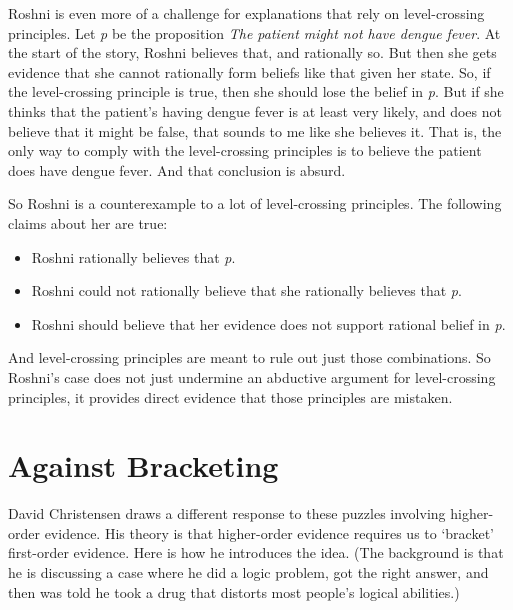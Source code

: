 \gls{Roshni} is even more of a challenge for explanations that rely on level-crossing principles. Let \emph{p} be the proposition \emph{The patient might not have dengue fever}. At the start of the story, \gls{Roshni} believes that, and rationally so. But then she gets evidence that she cannot rationally form beliefs like that given her state. So, if the level-crossing principle is true, then she should lose the belief in \emph{p}. But if she thinks that the patient's having dengue fever is at least very likely, and does not believe that it might be false, that sounds to me like she believes it. That is, the only way to comply with the level-crossing principles is to believe the patient does have dengue fever. And that conclusion is absurd.

So \gls{Roshni} is a counterexample to a lot of level-crossing principles. The following claims about her are true:

\begin{itemize}
\item{} \gls{Roshni} rationally believes that \emph{p}.

\item{} \gls{Roshni} could not rationally believe that she rationally believes that \emph{p}.

\item{} \gls{Roshni} should believe that her evidence does not support rational belief in \emph{p}.

\end{itemize}
And level-crossing principles are meant to rule out just those combinations. So \gls{Roshni}'s case does not just undermine an abductive argument for level-crossing principles, it provides direct evidence that those principles are mistaken.

\section{Against Bracketing}
\label{againstbracketing}

David Christensen draws a different response to these puzzles involving higher-order evidence. His theory is that higher-order evidence requires us to `bracket' first-order evidence. Here is how he introduces the idea. (The background is that he is discussing a case where he did a logic problem, got the right answer, and then was told he took a drug that distorts most people's logical abilities.)

